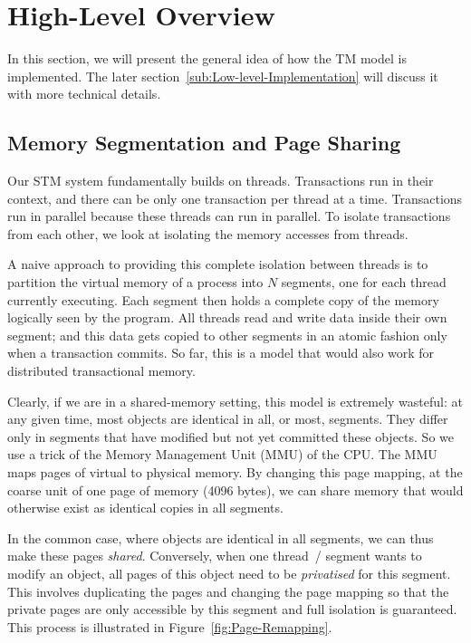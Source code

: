\documentclass{sigplanconf}
\begin{document}
\section{High-Level Overview}

In this section, we will present the general idea of how the TM model is
implemented.  The later section~\ref{sub:Low-level-Implementation} will
discuss it with more technical details.

\subsection{Memory Segmentation and Page Sharing}

Our STM system fundamentally builds on threads. Transactions run in
their context, and there can be only one transaction per thread at a
time. Transactions run in parallel because these threads can run in
parallel. To isolate transactions from each other, we look
at isolating the memory accesses from threads.

A naive approach to providing this complete isolation between threads
is to partition the virtual memory of a process into $N$ segments, one
for each thread currently executing.  Each segment then holds a
complete copy of the memory logically seen by the program.  All
threads read and write data inside their own segment; and this data
gets copied to other segments in an atomic fashion only when a
transaction commits.  So far, this is a model that would also work for
distributed transactional memory.

Clearly, if we are in a shared-memory setting, this model is extremely
wasteful: at any given time, most objects are identical in all, or
most, segments.  They differ only in segments that have modified but
not yet committed these objects.  So we use a trick of the Memory
Management Unit (MMU) of the CPU.  The MMU maps pages of virtual to
physical memory.  By changing this page mapping, at the coarse unit of
one page of memory (4096 bytes), we can share memory that would
otherwise exist as identical copies in all segments.

In the common case, where objects are identical in all segments, we
can thus make these pages \emph{shared}. Conversely, when one thread~/
segment wants to modify an object, all pages of this object need to be
\emph{privatised} for this segment. This involves duplicating the
pages and changing the page mapping so that the private pages are only
accessible by this segment and full isolation is guaranteed.  This
process is illustrated in Figure~\ref{fig:Page-Remapping}.
\end{document}

